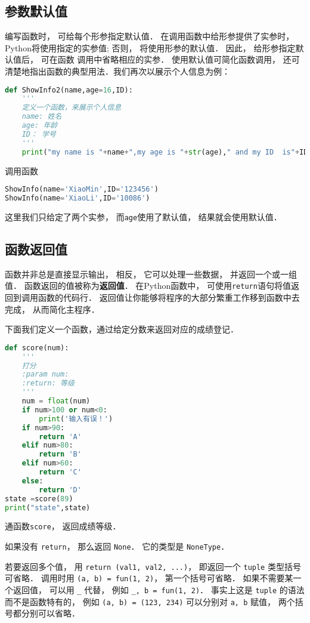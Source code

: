 \subsection{参数默认值}
编写函数时， 可给每个形参指定默认值． 在调用函数中给形参提供了实参时， Python将使用指定的实参值; 否则， 将使用形参的默认值． 因此， 给形参指定默认值后， 可在函数
调用中省略相应的实参． 使用默认值可简化函数调用， 还可清楚地指出函数的典型用法．我们再次以展示个人信息为例：
\begin{lstlisting}[language=python]
def ShowInfo2(name,age=16,ID):
    '''
    定义一个函数，来展示个人信息
    name: 姓名
    age: 年龄
    ID： 学号
    '''
    print("my name is "+name+",my age is "+str(age)," and my ID  is"+ID)
\end{lstlisting}
调用函数
\begin{lstlisting}[language=python]
ShowInfo(name='XiaoMin',ID='123456')
ShowInfo(name='XiaoLi',ID='10086')
\end{lstlisting}
这里我们只给定了两个实参， 而\verb|age|使用了默认值， 结果就会使用默认值．

\subsection{函数返回值}
函数并非总是直接显示输出， 相反， 它可以处理一些数据， 并返回一个或一组值． 函数返回的值被称为\textbf{返回值}． 在Python函数中， 可使用\verb|return|语句将值返回到调用函数的代码行． 返回值让你能够将程序的大部分繁重工作移到函数中去完成， 从而简化主程序．

下面我们定义一个函数，通过给定分数来返回对应的成绩登记．
\begin{lstlisting}[language=python]
def score(num):
    '''
    打分
    :param num:
    :return: 等级
    '''
    num = float(num)
    if num>100 or num<0:
        print('输入有误！')
    if num>90:
        return 'A'
    elif num>80:
        return 'B'
    elif num>60:
        return 'C'
    else:
        return 'D'
state =score(89)
print("state",state)
\end{lstlisting}
通函数\verb|score|， 返回成绩等级．

如果没有 \verb|return|， 那么返回 \verb|None|． 它的类型是 \verb|NoneType|．

若要返回多个值， 用 \verb|return (val1, val2, ...)|， 即返回一个 \verb|tuple| 类型括号可省略． 调用时用 \verb|(a, b) = fun(1, 2)|， 第一个括号可省略． 如果不需要某一个返回值， 可以用 \verb|_| 代替， 例如 \verb|_, b = fun(1, 2)|． 事实上这是 \verb|tuple| 的语法而不是函数特有的， 例如 \verb|(a, b) = (123, 234)| 可以分别对 \verb|a, b| 赋值， 两个括号都分别可以省略．

